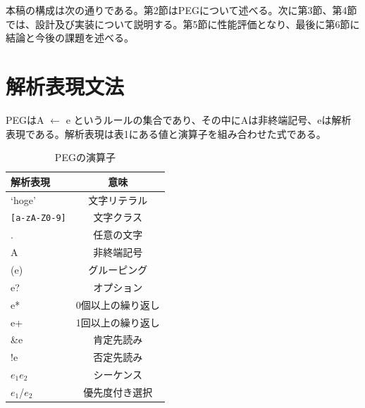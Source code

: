 \documentclass[submit,techrep]{ipsj}
\begin{document}



本稿の構成は次の通りである。第2節はPEGについて述べる。次に第3節、第4節では、設計及び実装について説明する。第5節に性能評価となり、最後に第6節に結論と今後の課題を述べる。\\


\section{解析表現文法}

PEGはA $\leftarrow$ e というルールの集合であり、その中にAは非終端記号、eは解析表現である。解析表現は表1にある値と演算子を組み合わせた式である。




\begin{table}[h]
	\caption{PEGの演算子}
	\centering
\begin{tabular}[t]{lc}
	\hline\hline
	 解析表現 & 意味 \\\hline
	 `hoge' &  文字リテラル \\
	\texttt{[a-zA-Z0-9]} & 文字クラス\\
	 . & 任意の文字 \\
	 A & 非終端記号 \\
	 (e) & グルーピング \\
	 e? & オプション \\
	 e* & 0個以上の繰り返し \\
	 e+ & 1回以上の繰り返し \\
	 \&e & 肯定先読み　\\
	 !e & 否定先読み \\
	 $e_1$$e_2$ & シーケンス \\
	 $e_1$/$e_2$ & 優先度付き選択 \\\hline
\end{tabular}
\end{table}
\end{document}
